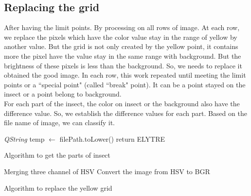 \subsection{Replacing the grid}
After having the limit points. By processing on all rows of image. At each row, we replace the pixels which have the color value stay in the range of yellow by another value. But the grid is not only created by the yellow point, it contains more the pixel have the value stay in the same range with background. But the brightness of these pixels is less than the background. So, we needs to replace it obtained the good image. In each row, this work repeated until meeting the limit points or a ``special point" (called ``break" point). It can be a point stayed on the insect or a point belong to background.\\
For each part of the insect, the color on insect or the background also have the difference value. So, we establish the difference values for each part. Based on the file name of image, we can classify it.\\
\IncMargin{1em}
\begin{algorithm}[H]
\Indm
{}
\Indp
\textit{QString} temp $\leftarrow$ filePath.toLower()\;
return ELYTRE\;
\caption{Algorithm to get the parts of insect}
\end{algorithm}
\DecMargin{1em}
\IncMargin{1em}
\begin{algorithm}[H]
\Indm
{}
\Indp
{}
Merging three channel of HSV\;
Convert the image from HSV to BGR\;
\caption{Algorithm to replace the yellow grid}
\end{algorithm}
\DecMargin{1em}
